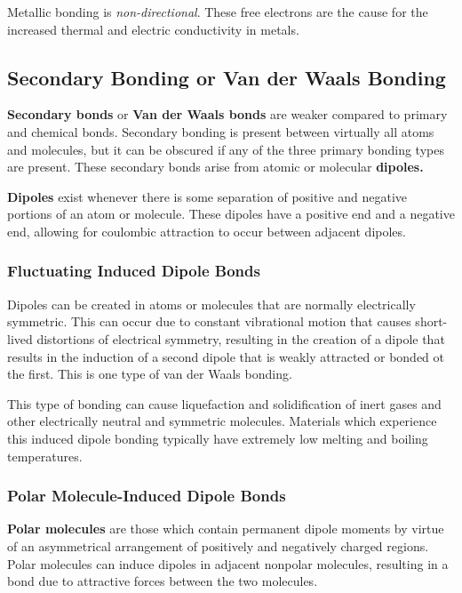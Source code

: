 \documentclass{article}
\begin{document}
Metallic bonding is \textit{non-directional}. These free electrons are the cause for the increased thermal and electric conductivity in metals.

\subsection{Secondary Bonding or Van der Waals Bonding}

\textbf{Secondary bonds} or \textbf{Van der Waals bonds} are weaker compared to primary and chemical bonds. Secondary bonding is present between virtually all atoms and molecules, but it can be obscured if any of the three primary bonding types are present. These secondary bonds arise from atomic or molecular \textbf{dipoles.}

\textbf{Dipoles} exist whenever there is some separation of positive and negative portions of an atom or molecule. These dipoles have a positive end and a negative end, allowing for coulombic attraction to occur between adjacent dipoles.

\subsubsection{Fluctuating Induced Dipole Bonds}

Dipoles can be created in atoms or molecules that are normally electrically symmetric. This can occur due to constant vibrational motion that causes short-lived distortions of electrical symmetry, resulting in the creation of a dipole that results in the induction of a second dipole that is weakly attracted or bonded ot the first. This is one type of van der Waals bonding.

This type of bonding can cause liquefaction and solidification of inert gases and other electrically neutral and symmetric molecules. Materials which experience this induced dipole bonding typically have extremely low melting and boiling temperatures. 

\subsubsection{Polar Molecule-Induced Dipole Bonds}

\textbf{Polar molecules} are those which contain permanent dipole moments by virtue of an asymmetrical arrangement of positively and negatively charged regions. Polar molecules can induce dipoles in adjacent nonpolar molecules, resulting in a bond due to attractive forces between the two molecules. 
\end{document}
